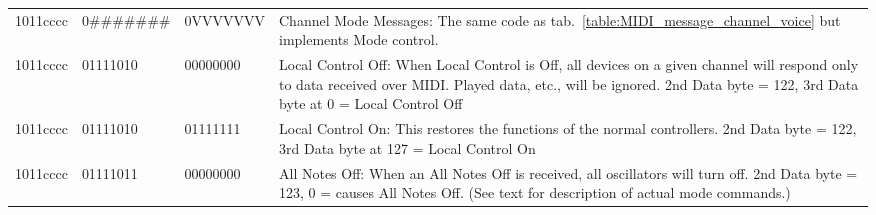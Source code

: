 
        \begin{center}
        \tablelasttail{\hline}
        \begin{supertabular}{| C{2cm} | C{2cm} | C{2.3cm} | C{8cm} |}
             1011cccc & 0\#\#\#\#\#\#\# & 0VVVVVVV & Channel Mode Messages: The same code as tab.~\ref{table:MIDI_message_channel_voice} but implements Mode control. \\
                1011cccc & 01111010 & 00000000 & Local Control Off: When Local Control is Off, all devices on a given channel will respond only to data received over MIDI. Played data, etc., will be ignored. 2nd Data byte = 122, 3rd Data byte at 0 = Local Control Off \\
             1011cccc & 01111010 & 01111111 & Local Control On: This restores the functions of the normal controllers. 2nd Data byte = 122, 3rd Data byte at 127 = Local Control On  \\
                1011cccc & 01111011 & 00000000 & All Notes Off: When an All Notes Off is received, all oscillators will turn off. 2nd Data byte = 123, 0 = causes All Notes Off. (See text for description of actual mode commands.) \\

\end{supertabular}
\end{center}
